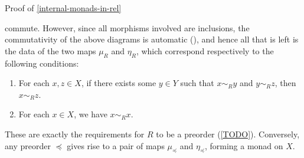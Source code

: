 \begin{Proof}{Proof of \cref{internal-monads-in-rel}}
\begin{webcompile}
%
    \end{webcompile}%
    commute. However, since all morphisms involved are inclusions, the commutativity of the above diagrams is automatic (), and hence all that is left is the data of the two maps $\mu_{R}$ and $\eta_{R}$, which correspond respectively to the following conditions:
    \begin{enumerate}
        \item\label{proof-of-internal-monads-in-rel-1}For each $x,z\in X$, if there exists some $y\in Y$ such that $x\sim_{R}y$ and $y\sim_{R}z$, then $x\sim_{R}z$.
        \item\label{proof-of-internal-monads-in-rel-2}For each $x\in X$, we have $x\sim_{R}x$.
    \end{enumerate}
    These are exactly the requirements for $R$ to be a preorder (\cref{TODO}). Conversely, any preorder $\preceq$ gives rise to a pair of maps $\mu_{\preceq}$ and $\eta_{\preceq}$, forming a monad on $X$.
\end{Proof}
